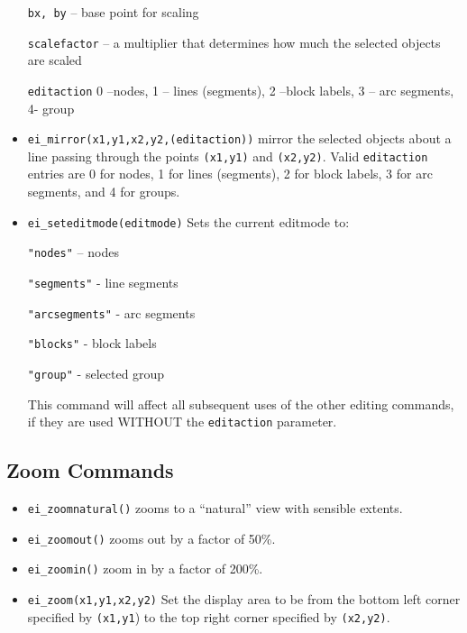 \begin{itemize}
\texttt{bx, by} -- base point for scaling

\texttt{scalefactor} -- a multiplier that determines how much the selected
objects are scaled

\texttt{editaction} 0 --nodes, 1 -- lines (segments), 2 --block labels, 3 --
arc segments, 4- group

\item \texttt{ei\_mirror(x1,y1,x2,y2,(editaction))} mirror the selected objects about
a line passing through the points \texttt{(x1,y1)} and
\texttt{(x2,y2)}. Valid \texttt{editaction} entries are 0 for
nodes, 1 for lines (segments), 2 for block labels, 3 for arc
segments, and 4 for groups.

\item \texttt{ei\_seteditmode(editmode)} Sets the current editmode to:

\texttt{"nodes"} -- nodes

\texttt{"segments"} - line segments

\texttt{"arcsegments"} - arc segments

\texttt{"blocks"} - block labels

\texttt{"group"} - selected group

This command will affect all subsequent uses of the other editing
commands, if they are used WITHOUT the \texttt{editaction}
parameter.
\end{itemize}

\subsection{Zoom Commands}

\begin{itemize}
\item \texttt{ei\_zoomnatural()} zooms to a ``natural'' view with sensible extents.

\item \texttt{ei\_zoomout()} zooms out by a factor of 50{\%}.

\item \texttt{ei\_zoomin()} zoom in by a factor of 200{\%}.

\item \texttt{ei\_zoom(x1,y1,x2,y2)} Set the display area to be from the bottom left
corner specified by \texttt{(x1,y1}) to the top right corner
specified by \texttt{(x2,y2)}.
\end{itemize}

